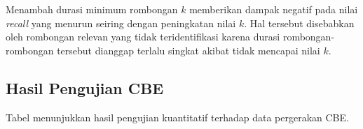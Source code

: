 Menambah durasi minimum rombongan $k$ memberikan dampak negatif pada nilai \textit{recall} yang menurun seiring dengan peningkatan nilai $k$. Hal tersebut disebabkan oleh rombongan relevan yang tidak teridentifikasi karena durasi rombongan-rombongan tersebut dianggap terlalu singkat akibat tidak mencapai nilai $k$.  

\subsection{Hasil Pengujian CBE}
\label{subsec:veiig-result}

Tabel menunjukkan hasil pengujian kuantitatif terhadap data pergerakan CBE.